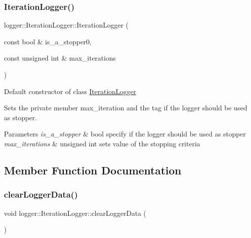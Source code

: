 \subsubsection{\texorpdfstring{Iteration\+Logger()}{IterationLogger()}}
{\footnotesize\ttfamily logger\+::\+Iteration\+Logger\+::\+Iteration\+Logger (\begin{DoxyParamCaption}\item[{const bool \&}]{is\+\_\+a\+\_\+stopper0,  }\item[{const unsigned int \&}]{max\+\_\+iterations }\end{DoxyParamCaption})}



Default constructor of class {\ttfamily \mbox{\hyperlink{classlogger_1_1_iteration_logger}{Iteration\+Logger}}} 

Sets the private member {\ttfamily max\+\_\+iteration} and the tag if the logger should be used as stopper.


\begin{DoxyParams}{Parameters}
{\em is\+\_\+a\+\_\+stopper} & {\ttfamily bool} specify if the logger should be used as stopper \\
\hline
{\em max\+\_\+iterations} & {\ttfamily unsigned int} sets value of the stopping criteria \\
\hline
\end{DoxyParams}


\subsection{Member Function Documentation}
\mbox{\label{classlogger_1_1_iteration_logger_a7439c16a1482ad8c09f8ab37baf45690}} 
\subsubsection{\texorpdfstring{clear\+Logger\+Data()}{clearLoggerData()}}
{\footnotesize\ttfamily void logger\+::\+Iteration\+Logger\+::clear\+Logger\+Data (\begin{DoxyParamCaption}{ }\end{DoxyParamCaption})\hspace{0.3cm}{\ttfamily [virtual]}}



